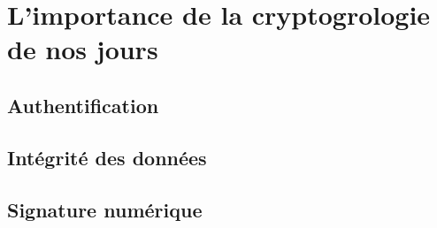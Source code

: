 \chapter{L'importance de la cryptogrologie de nos jours}
\section{Authentification}
\section{Intégrité des données}
\section{Signature numérique}


